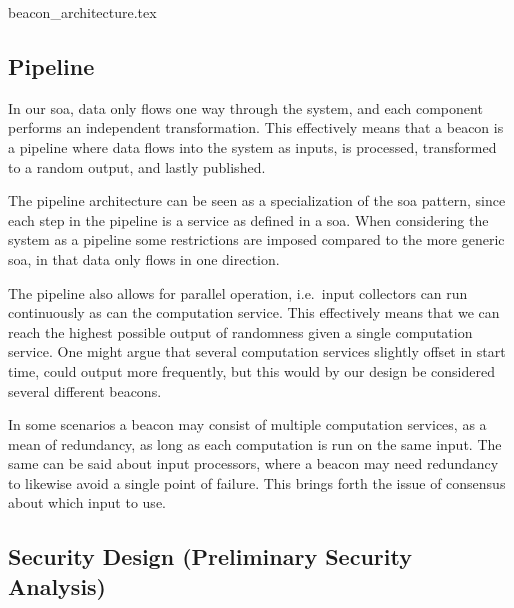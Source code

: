 {beacon_architecture.tex}

\subsection{Pipeline}%
\label{sub:pipeline}
In our \gls{soa}, %
data only flows one way through the system, and each component performs an independent transformation.
This effectively means that a beacon is a pipeline where data flows into the system as inputs, is processed, transformed to a random output, and lastly published.

The pipeline architecture can be seen as a specialization of the \gls{soa} pattern, since each step in the pipeline is a service as defined in a \gls{soa}.
When considering the system as a pipeline some restrictions are imposed compared to the more generic \gls{soa}, in that data only flows in one direction.

The pipeline also allows for parallel operation, i.e.\ input collectors can run continuously as can the computation service.
This effectively means that we can reach the highest possible output of randomness given a single computation service.
One might argue that several computation services slightly offset in start time, could output more frequently, but this would by our design be considered several different beacons.

In some scenarios a beacon may consist of multiple computation services, as a mean of redundancy, as long as each computation is run on the same input.
The same can be said about input processors, where a beacon may need redundancy to likewise avoid a single point of failure.
This brings forth the issue of consensus about which input to use.


\subsection{Security Design (Preliminary Security Analysis)}



